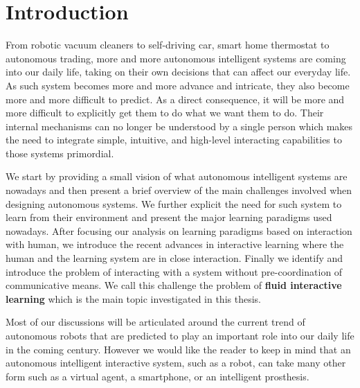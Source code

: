 \renewcommand{\chapterpath}{\allchapterspath/introduction}
\renewcommand{\imgpath}{\chapterpath/img}

\chapter{Introduction}
\label{chapter:introduction}
\minitoc

From robotic vacuum cleaners to self-driving car, smart home thermostat to autonomous trading, more and more autonomous intelligent systems are coming into our daily life, taking on their own decisions that can affect our everyday life. As such system becomes more and more advance and intricate, they also become more and more difficult to predict. As a direct consequence, it will be more and more difficult to explicitly get them to do what we want them to do. Their internal mechanisms can no longer be understood by a single person which makes the need to integrate simple, intuitive, and high-level interacting capabilities to those systems primordial.

We start by providing a small vision of what autonomous intelligent systems are nowadays and then present a brief overview of the main challenges involved when designing autonomous systems. We further explicit the need for such system to learn from their environment and present the major learning paradigms used nowadays. After focusing our analysis on learning paradigms based on interaction with human, we introduce the recent advances in interactive learning where the human and the learning system are in close interaction. Finally we identify and introduce the problem of interacting with a system without pre-coordination of communicative means. We call this challenge the problem of \textbf{fluid interactive learning} which is the main topic investigated in this thesis.

Most of our discussions will be articulated around the current trend of autonomous robots that are predicted to play an important role into our daily life in the coming century. However we would like the reader to keep in mind that an autonomous intelligent interactive system, such as a robot, can take many other form such as a virtual agent, a smartphone, or an intelligent prosthesis.

